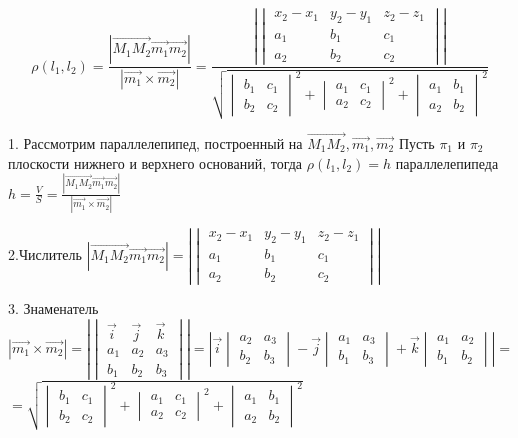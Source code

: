 \documentclass[a4paper, 10pt]{article}
\newcommand{\bvec}[1]{\overrightarrow{#1}}
\renewcommand{\a}{\vec{a}}
\renewcommand{\b}{\vec{b}}
\renewcommand{\i}{\vec{i}}
\renewcommand{\j}{\vec{j}}
\renewcommand{\k}{\vec{k}}
\begin{document}
$$\rho(l_1, l_2) = \frac{ |\bvec{M_1M_2}\vec{m_1}\vec{m_2}| }{ |\vec{m_1}\times\vec{m_2}| }=
\frac{ |\begin{vmatrix}x_2-x_1&y_2-y_1&z_2-z_1\\a_1&b_1&c_1\\a_2&b_2&c_2\end{vmatrix}| }
    {\sqrt{\begin{vmatrix}b_1&c_1\\b_2&c_2\end{vmatrix}^2+
    \begin{vmatrix}a_1&c_1\\a_2&c_2\end{vmatrix}^2+
    \begin{vmatrix}a_1&b_1\\a_2&b_2\end{vmatrix}^2}}$$

1. Рассмотрим параллелепипед, построенный на $\bvec{M_1M_2}, \vec{m_1}, \vec{m_2}$
Пусть $\pi_1$ и $\pi_2$ плоскости нижнего и верхнего оснований, тогда $\rho(l_1, l_2) = h$ параллелепипеда
$h = \frac{V}{S} = \frac{ |\bvec{M_1M_2}\vec{m_1}\vec{m_2}| }{ |\vec{m_1}\times\vec{m_2}| }$

2.Числитель $|\bvec{M_1M_2}\vec{m_1}\vec{m_2}| =  |\begin{vmatrix}x_2-x_1&y_2-y_1&z_2-z_1\\
a_1&b_1&c_1\\a_2&b_2&c_2\end{vmatrix}|$

3. Знаменатель $|\vec{m_1}\times\vec{m_2}| = |\begin{vmatrix}
    \i&\j&\k\\
    a_1 & a_2 & a_3\\
    b_1 & b_2 & b_3
\end{vmatrix}| = |\i
\begin{vmatrix}
    a_2 & a_3\\
    b_2 & b_3
\end{vmatrix} - \j
\begin{vmatrix}
    a_1 & a_3\\
    b_1 & b_3
\end{vmatrix} + \k
\begin{vmatrix}
    a_1 & a_2\\
    b_1 & b_2
\end{vmatrix}| = $ \\
$=\sqrt{\begin{vmatrix}b_1&c_1\\b_2&c_2\end{vmatrix}^2+
\begin{vmatrix}a_1&c_1\\a_2&c_2\end{vmatrix}^2+
\begin{vmatrix}a_1&b_1\\a_2&b_2\end{vmatrix}^2}$
\end{document}
